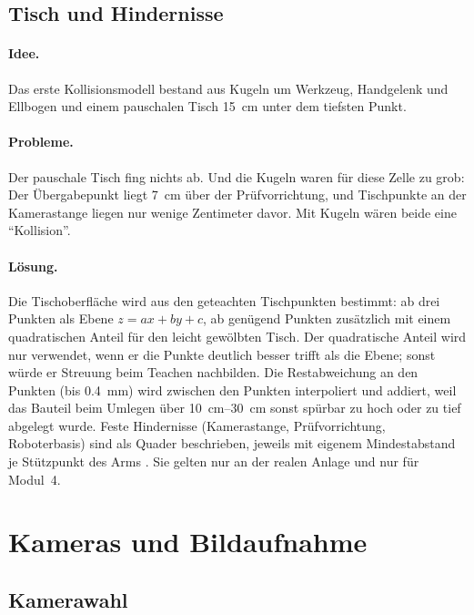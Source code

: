 \subsection{Tisch und Hindernisse}
\label{sec:tisch}

\paragraph{Idee.} Das erste Kollisionsmodell bestand aus Kugeln um Werkzeug, Handgelenk und
Ellbogen und einem pauschalen Tisch \SI{15}{\centi\metre} unter dem tiefsten Punkt.

\paragraph{Probleme.} Der pauschale Tisch fing nichts ab. Und die Kugeln waren für diese Zelle
zu grob: Der Übergabepunkt liegt \SI{7}{\centi\metre} über der Prüfvorrichtung, und Tischpunkte
an der Kamerastange liegen nur wenige Zentimeter davor. Mit Kugeln wären beide eine
\enquote{Kollision}.

\paragraph{Lösung.} Die Tischoberfläche wird aus den geteachten Tischpunkten bestimmt: ab
drei Punkten als Ebene $z = ax + by + c$, ab genügend Punkten zusätzlich mit einem
quadratischen Anteil für den leicht gewölbten Tisch. Der quadratische Anteil wird nur
verwendet, wenn er die Punkte deutlich besser trifft als die Ebene; sonst würde er Streuung
beim Teachen nachbilden. Die Restabweichung an den Punkten (bis \SI{0.4}{\milli\metre}) wird
zwischen den Punkten interpoliert und addiert, weil das Bauteil beim Umlegen über
\SIrange{10}{30}{\centi\metre} sonst spürbar zu hoch oder zu tief abgelegt wurde. Feste
Hindernisse (Kamerastange, Prüfvorrichtung, Roboterbasis) sind als Quader beschrieben, jeweils
mit eigenem Mindestabstand je Stützpunkt des Arms .
Sie gelten nur an der realen Anlage und nur für Modul~4.

\section{Kameras und Bildaufnahme}
\label{sec:kameras}

\subsection{Kamerawahl}

